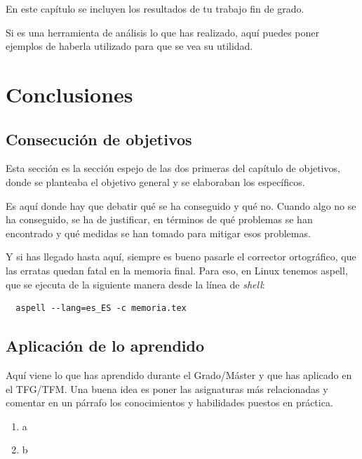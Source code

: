 \documentclass[a4paper, 12pt]{book}
\begin{document}
En este capítulo se incluyen los resultados de tu trabajo fin de grado.

Si es una herramienta de análisis lo que has realizado, aquí puedes poner ejemplos de haberla utilizado para que se vea su utilidad.



\cleardoublepage
\chapter{Conclusiones}
\label{chap:conclusiones}


\section{Consecución de objetivos}
\label{sec:consecucion-objetivos}

Esta sección es la sección espejo de las dos primeras del capítulo de objetivos, donde se planteaba el objetivo general y se elaboraban los específicos.

Es aquí donde hay que debatir qué se ha conseguido y qué no. 
Cuando algo no se ha conseguido, se ha de justificar, en términos de qué problemas se han encontrado y qué medidas se han tomado para mitigar esos problemas.

Y si has llegado hasta aquí, siempre es bueno pasarle el corrector ortográfico, que las erratas quedan fatal en la memoria final.
Para eso, en Linux tenemos aspell, que se ejecuta de la siguiente manera desde la línea de \emph{shell}:

\begin{verbatim}
  aspell --lang=es_ES -c memoria.tex
\end{verbatim}

\section{Aplicación de lo aprendido}
\label{sec:aplicacion}

Aquí viene lo que has aprendido durante el Grado/Máster y que has aplicado en el TFG/TFM. Una buena idea es poner las asignaturas más relacionadas y comentar en un párrafo los conocimientos y habilidades puestos en práctica.

\begin{enumerate}
  \item a
  \item b
\end{enumerate}
\end{document}
